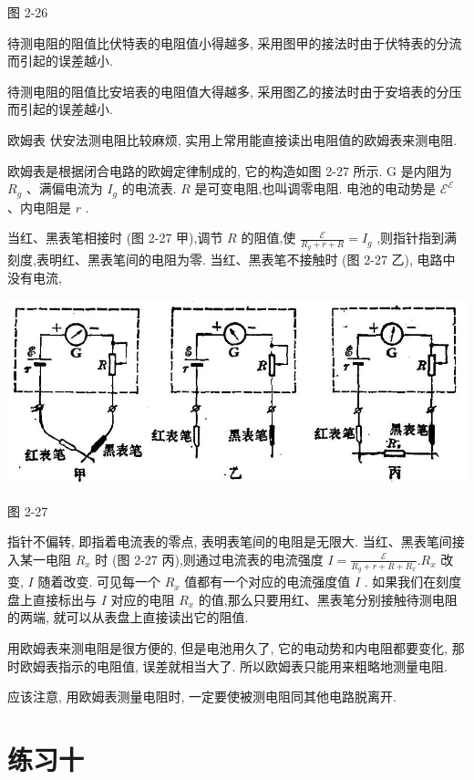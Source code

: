 \documentclass[10pt]{article}
\begin{document}
图 2-26

待测电阻的阻值比伏特表的电阻值小得越多, 采用图甲的接法时由于伏特表的分流而引起的误差越小.

待测电阻的阻值比安培表的电阻值大得越多, 采用图乙的接法时由于安培表的分压而引起的误差越小.

欧姆表 伏安法测电阻比较麻烦, 实用上常用能直接读出电阻值的欧姆表来测电阻.

欧姆表是根据闭合电路的欧姆定律制成的, 它的构造如图 2-27 所示. \(\mathrm{G}\) 是内阻为 \({R}_{g}\) 、满偏电流为 \({I}_{g}\) 的电流表. \(R\) 是可变电阻,也叫调零电阻. 电池的电动势是 \({\mathcal{E}}^{\mathcal{E}}\) 、内电阻是 \(r\) .

当红、黑表笔相接时 (图 2-27 甲),调节 \(R\) 的阻值,使 \(\frac{\mathcal{E}}{{R}_{g} + r + R} = {I}_{g}\) ,则指针指到满刻度,表明红、黑表笔间的电阻为零. 当红、黑表笔不接触时 (图 2-27 乙), 电路中没有电流,

\begin{center}
\includegraphics[max width=1.0\textwidth]{images/01913056-1f15-74d8-9184-9aab52c9d66b_97_486798.jpg}
\end{center}

图 2-27

指针不偏转, 即指着电流表的零点, 表明表笔间的电阻是无限大. 当红、黑表笔间接入某一电阻 \({R}_{x}\) 时 (图 2-27 丙),则通过电流表的电流强度 \(I = \frac{\mathcal{E}}{{R}_{g} + r + R + {R}_{x}}.{R}_{x}\) 改变, \(I\) 随着改变. 可见每一个 \({R}_{x}\) 值都有一个对应的电流强度值 \(I\) . 如果我们在刻度盘上直接标出与 \(I\) 对应的电阻 \({R}_{x}\) 的值,那么只要用红、黑表笔分别接触待测电阻的两端, 就可以从表盘上直接读出它的阻值.

用欧姆表来测电阻是很方便的, 但是电池用久了, 它的电动势和内电阻都要变化, 那时欧姆表指示的电阻值, 误差就相当大了. 所以欧姆表只能用来粗略地测量电阻.

应该注意, 用欧姆表测量电阻时, 一定要使被测电阻同其他电路脱离开.

\section*{练习十}
\end{document}
